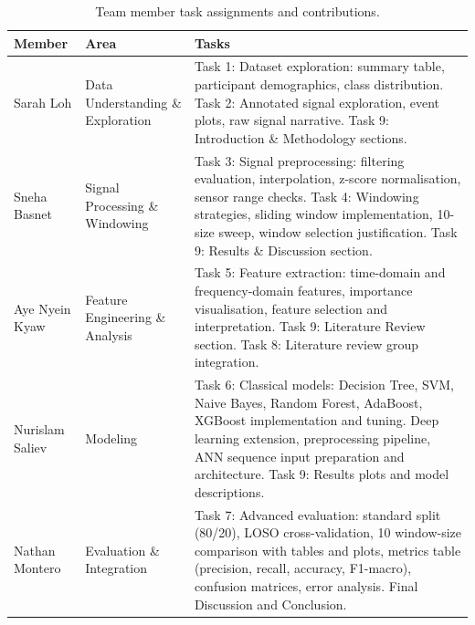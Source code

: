 \documentclass[12pt,a4paper]{cibb}
\begin{document}
\begin{table}[H]
\centering
\small
\begin{tabularx}{\textwidth}{lp{3.2cm}X}
\toprule
\textbf{Member} & \textbf{Area} & \textbf{Tasks} \\
\midrule
\rowcolor{LightBlue} Sarah Loh       & Data Understanding \& Exploration  & Task 1: Dataset exploration: summary table, participant demographics, class distribution. Task 2: Annotated signal exploration, event plots, raw signal narrative. Task 9: Introduction \& Methodology sections. \\
Sneha Basnet    & Signal Processing \& Windowing     & Task 3: Signal preprocessing: filtering evaluation, interpolation, z-score normalisation, sensor range checks. Task 4: Windowing strategies, sliding window implementation, 10-size sweep, window selection justification. Task 9: Results \& Discussion section. \\
\rowcolor{LightBlue} Aye Nyein Kyaw  & Feature Engineering \& Analysis    & Task 5: Feature extraction: time-domain and frequency-domain features, importance visualisation, feature selection and interpretation. Task 9: Literature Review section. Task 8: Literature review group integration. \\
Nurislam Saliev & Modeling                           & Task 6: Classical models: Decision Tree, SVM, Naive Bayes, Random Forest, AdaBoost, XGBoost implementation and tuning. Deep learning extension, preprocessing pipeline, ANN sequence input preparation and architecture. Task 9: Results plots and model descriptions. \\
\rowcolor{LightBlue} Nathan Montero  & Evaluation \& Integration          & Task 7: Advanced evaluation: standard split (80/20), LOSO cross-validation, 10 window-size comparison with tables and plots, metrics table (precision, recall, accuracy, F1-macro), confusion matrices, error analysis. Final Discussion and Conclusion. \\
\bottomrule
\end{tabularx}
\caption{Team member task assignments and contributions.\label{tab:contributions}}
\end{table}
\end{document}
